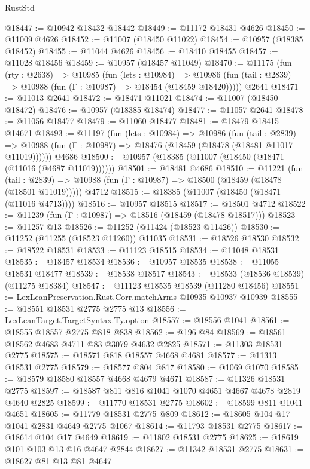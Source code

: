 \begin{lexlean}{RustStd}
\begin{coremodule}
@18447 := @10942 @18432 @18442
@18449 := @11172 @18431 @4626
@18450 := @11009 @4626
@18452 := @11007 (@18450 @11022)
@18454 := @10957 (@18385 @18452)
@18455 := @11044 @4626
@18456 := @18410 @18455
@18457 := @11028 @18456
@18459 := @10957 (@18457 @11049)
@18470 := @11175
    (fun (rty : @2638) =>
    @10985
      (fun (lets : @10984) =>
      @10986 (fun (tail : @2839) => @10988 (fun (Γ : @10987) => @18454 (@18459 @18420)))))
    @2641
@18471 := @11013 @2641
@18472 := @18471 @11021
@18474 := @11007 (@18450 @18472)
@18476 := @10957 (@18385 @18474)
@18477 := @11057 @2641
@18478 := @11056 @18477
@18479 := @11060 @18477
@18481 := @18479 @18415 @14671
@18493 := @11197
    (fun (lets : @10984) =>
    @10986
      (fun (tail : @2839) =>
      @10988 (fun (Γ : @10987) => @18476 (@18459 (@18478 (@18481 @11017 @11019))))))
    @4686
@18500 := @10957 (@18385 (@11007 (@18450 (@18471 (@11016 (@4687 @11019))))))
@18501 := @18481 @4686
@18510 := @11221
    (fun (tail : @2839) => @10988 (fun (Γ : @10987) => @18500 (@18459 (@18478 (@18501 @11019)))))
    @4712
@18515 := @18385 (@11007 (@18450 (@18471 (@11016 @4713))))
@18516 := @10957 @18515
@18517 := @18501 @4712
@18522 := @11239 (fun (Γ : @10987) => @18516 (@18459 (@18478 @18517)))
@18523 := @11257 @13
@18526 := @11252 (@11424 (@18523 @11426))
@18530 := @11252 (@11255 (@18523 @11260)) @11035
@18531 := @18526 @18530
@18532 := @18522 @18531
@18533 := @11123 @18515
@18534 := @11048 @18531
@18535 := @18457 @18534
@18536 := @10957 @18535
@18538 := @11055 @18531 @18477
@18539 := @18538 @18517
@18543 := @18533 (@18536 @18539) (@11275 @18384)
@18547 := @11123 @18535 @18539 (@11280 @18456)
@18551 := LexLeanPreservation.Rust.Corr.matchArms @10935 @10937 @10939
@18555 := @18551 @18531 @2775 @2775 @13
@18556 := LexLeanTarget.TargetSyntax.Ty.option
@18557 := @18556 @1041
@18561 := @18555 @18557 @2775 @818 @838
@18562 := @196 @84
@18569 := @18561 @18562 @4683 @4711 @83 @3079 @4632 @2825
@18571 := @11303 @18531 @2775
@18575 := @18571 @818 @18557 @4668 @4681
@18577 := @11313 @18531 @2775
@18579 := @18577 @804 @817
@18580 := @1069 @1070
@18585 := @18579 @18580 @18557 @4668 @4679 @4671
@18587 := @11326 @18531 @2775
@18597 := @18587 @811 @816 @1041 @1070 @4651 @4667 @4678 @2819 @4640 @2825
@18599 := @11770 @18531 @2775
@18602 := @18599 @811 @1041 @4651
@18605 := @11779 @18531 @2775 @809
@18612 := @18605 @104 @17 @1041 @2831 @4649 @2775 @1067
@18614 := @11793 @18531 @2775
@18617 := @18614 @104 @17 @4649
@18619 := @11802 @18531 @2775
@18625 := @18619 @101 @103 @13 @16 @4647 @2844
@18627 := @11342 @18531 @2775
@18631 := @18627 @81 @13 @81 @4647

\end{coremodule}
\end{lexlean}
